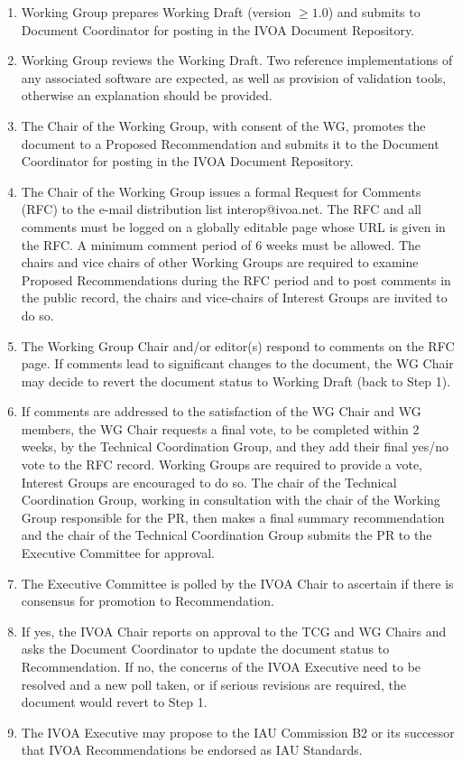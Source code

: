 \documentclass[11pt,a4paper]{ivoa}
\begin{document}
\begin{enumerate}
\item Working Group prepares Working Draft (version $\geq 1.0$) and submits to
Document Coordinator for posting in the IVOA Document Repository.

\item Working Group reviews the Working Draft. Two reference
implementations of any associated software are expected, as well as
provision of validation tools, otherwise an explanation should be
provided.

\item The Chair of the Working Group, with consent of the WG, promotes the
document to a Proposed Recommendation and submits it to the Document
Coordinator for posting in the IVOA Document Repository.

\item The Chair of the Working Group issues a formal Request for Comments
(RFC) to the e-mail distribution list interop@ivoa.net. The RFC and all
comments must be logged on a globally editable page whose URL is given
in the RFC. A minimum comment period of 6 weeks must be allowed. The
chairs and vice chairs of other Working Groups are required to examine
Proposed Recommendations during the RFC period and to post comments in
the public record, the chairs and vice-chairs of Interest Groups are
invited to do so.

\item The Working Group Chair and/or editor(s) respond to comments on the
RFC page. If comments lead to significant changes to the document, the
WG Chair may decide to revert the document status to Working Draft (back
to Step 1).

\item If comments are addressed to the satisfaction of the WG Chair and WG
members, the WG Chair requests a final vote, to be completed within 2
weeks, by the Technical Coordination Group, and they add their final
yes/no vote to the RFC record.  Working Groups are required to provide a
vote, Interest Groups are encouraged to do so. The chair of the
Technical Coordination Group, working in consultation with the chair of
the Working Group responsible for the PR, then makes a final summary
recommendation and the chair of the Technical Coordination Group submits
the PR to the Executive Committee for approval.

\item The Executive Committee is polled by the IVOA Chair to ascertain if
there is consensus for promotion to Recommendation.

\item If yes, the IVOA Chair reports on approval to the TCG and WG Chairs
and asks the Document Coordinator to update the document status to
Recommendation. If no, the concerns of the IVOA Executive need to be
resolved and a new poll taken, or if serious revisions are required, the
document would revert to Step 1.

\item The IVOA Executive may propose to the IAU Commission B2 or its
successor that IVOA Recommendations be endorsed as IAU Standards.
\end{enumerate}
\end{document}
